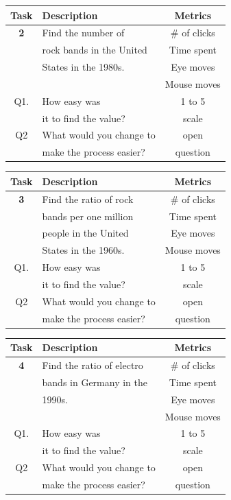 \documentclass[twocolumn, letterpaper,13pt]{scrartcl}
\begin{document}
    \begin{center}
    \begin{tabular} { | c | l | c | }
    \hline
     Task & Description & Metrics \\
    \hline
    \textbf{2} & Find the number of & \# of clicks \\
    & rock bands in the United & Time spent\\
    & States in the 1980s. & Eye moves\\
    &  & Mouse moves\\
    \hline
    Q1. & How easy was & 1 to 5\\
    & it to find the value? & scale \\
    \hline
    Q2 & What would you change to & open\\
    & make the process easier? & question\\
    \hline
    \end{tabular}
    \end{center}
    
    \begin{center}
    \begin{tabular} { | c | l | c | }
    \hline
     Task & Description & Metrics \\
    \hline
    \textbf{3} & Find the ratio of rock & \# of clicks \\
    & bands per one million & Time spent\\
    & people in the United & Eye moves\\
    & States in the 1960s. & Mouse moves\\
    \hline
    Q1. & How easy was & 1 to 5\\
    & it to find the value? & scale \\
    \hline
    Q2 & What would you change to & open\\
    & make the process easier? & question\\
    \hline
    \end{tabular}
    \end{center}
    
    \begin{center}
    \begin{tabular} { | c | l | c | }
    \hline
     Task & Description & Metrics \\
    \hline
    \textbf{4} & Find the ratio of electro & \# of clicks \\
    & bands in Germany in the & Time spent\\
    & 1990s. & Eye moves \\
    & & Mouse moves \\
    \hline
    Q1. & How easy was & 1 to 5\\
    & it to find the value? & scale \\
    \hline
    Q2 & What would you change to & open\\
    & make the process easier? & question\\
    \hline
    \end{tabular}
    \end{center}
\end{document}

